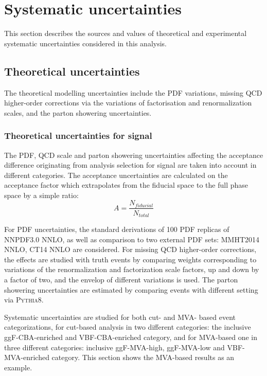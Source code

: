 \section{Systematic uncertainties}
\label{sec:hmhzz_sys}

This section describes the sources and values of theoretical and experimental systematic uncertainties considered in this analysis.

\subsection{Theoretical uncertainties}

The theoretical modelling uncertainties include the PDF variations, missing QCD higher-order corrections via the variations of factorisation and renormalization scales,
and the parton showering uncertainties.

\subsubsection{Theoretical uncertainties for signal}
\label{sec:hmhzz_theo_signal}

The PDF, QCD scale and parton showering uncertainties affecting the acceptance difference originating from analysis selection for signal are taken into account in different categories.
The acceptance uncertainties are calculated on the acceptance factor which extrapolates from the fiducial space to the full phase space by a simple ratio:
\begin{equation}
        A = \frac{N_{fiducial}}{N_{total}}
\end{equation}

For PDF uncertainties, the standard derivations of 100 PDF replicas of NNPDF3.0 NNLO, as well as comparison to two external PDF sets: MMHT2014 NNLO, CT14 NNLO are considered.
For missing QCD higher-order corrections, the effects are studied with truth events by comparing weights corresponding to
variations of the renormalization and factorization scale factors, up and down by a factor of two, and the envelop of different variations is used.
The parton showering uncertainties are estimated by comparing events with different setting via \textsc{Pythia8}.

Systematic uncertainties are studied for both cut- and MVA- based event categorizations, 
for cut-based analysis in two different categories: the inclusive ggF-CBA-enriched and VBF-CBA-enriched category,
and for MVA-based one in three different categories: inclusive ggF-MVA-high, ggF-MVA-low and VBF-MVA-enriched category.
This section shows the MVA-based results as an example.

